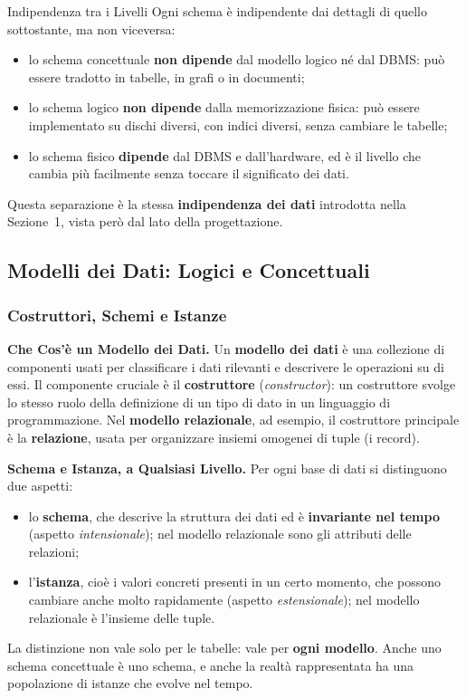 \documentclass[12pt]{extarticle}
\begin{document}
\begin{cbox}{Indipendenza tra i Livelli}
\noindent Ogni schema è indipendente dai dettagli di quello sottostante, ma non viceversa:
\begin{itemize}
    \item lo schema concettuale \textbf{non dipende} dal modello logico né dal DBMS: può essere tradotto in tabelle, in grafi o in documenti;
    \item lo schema logico \textbf{non dipende} dalla memorizzazione fisica: può essere implementato su dischi diversi, con indici diversi, senza cambiare le tabelle;
    \item lo schema fisico \textbf{dipende} dal DBMS e dall'hardware, ed è il livello che cambia più facilmente senza toccare il significato dei dati.
\end{itemize}
Questa separazione è la stessa \textbf{indipendenza dei dati} introdotta nella Sezione~1, vista però dal lato della progettazione.
\end{cbox}

\subsection{Modelli dei Dati: Logici e Concettuali}

\subsubsection{Costruttori, Schemi e Istanze}

\noindent \textbf{Che Cos'è un Modello dei Dati.} Un \textbf{modello dei dati} è una collezione di componenti usati per classificare i dati rilevanti e descrivere le operazioni su di essi. Il componente cruciale è il \textbf{costruttore} (\textit{constructor}): un costruttore svolge lo stesso ruolo della definizione di un tipo di dato in un linguaggio di programmazione. Nel \textbf{modello relazionale}, ad esempio, il costruttore principale è la \textbf{relazione}, usata per organizzare insiemi omogenei di tuple (i record).

\medskip
\noindent \textbf{Schema e Istanza, a Qualsiasi Livello.} Per ogni base di dati si distinguono due aspetti:
\begin{itemize}
    \item lo \textbf{schema}, che descrive la struttura dei dati ed è \textbf{invariante nel tempo} (aspetto \textit{intensionale}); nel modello relazionale sono gli attributi delle relazioni;
    \item l'\textbf{istanza}, cioè i valori concreti presenti in un certo momento, che possono cambiare anche molto rapidamente (aspetto \textit{estensionale}); nel modello relazionale è l'insieme delle tuple.
\end{itemize}
La distinzione non vale solo per le tabelle: vale per \textbf{ogni modello}. Anche uno schema concettuale è uno schema, e anche la realtà rappresentata ha una popolazione di istanze che evolve nel tempo.
\end{document}
